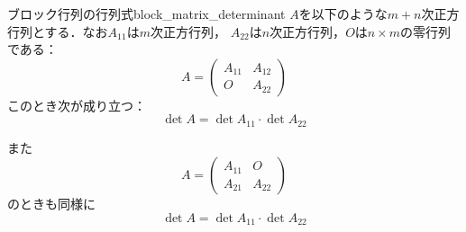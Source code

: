 \begin{prop}{ブロック行列の行列式}{block_matrix_determinant}
  $A$を以下のような$m+n$次正方行列とする．なお$A_{11}$は$m$次正方行列，
  $A_{22}$は$n$次正方行列，$O$は$n \times m$の零行列である：
  \[
    A=
    \begin{pmatrix}
      A_{11} & A_{12} \\
      O & A_{22}
    \end{pmatrix}
  \]
  このとき次が成り立つ：
  \[
    \det A = \det A_{11} \cdot \det A_{22}
  \]

  また
  \[
  A = \begin{pmatrix}
    A_{11} & O \\
    A_{21} & A_{22}
  \end{pmatrix}
  \]
  のときも同様に
  \[
    \det A = \det A_{11} \cdot \det A_{22}
  \]  
\end{prop}

